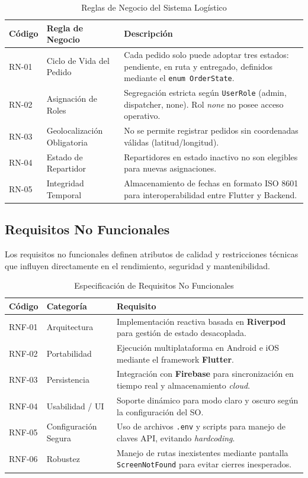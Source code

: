 \begin{table}[H]
\centering
\caption{Reglas de Negocio del Sistema Logístico}
\vspace{3mm}
\begin{tabularx}{\textwidth}{l p{4cm} L}
\toprule
\textbf{Código} & \textbf{Regla de Negocio} & \textbf{Descripción} \\
\midrule
RN-01 & Ciclo de Vida del Pedido & Cada pedido solo puede adoptar tres estados: pendiente, en ruta y entregado, definidos mediante el \texttt{enum OrderState}. \\
RN-02 & Asignación de Roles & Segregación estricta según \texttt{UserRole} (admin, dispatcher, none). Rol \textit{none} no posee acceso operativo. \\
RN-03 & Geolocalización Obligatoria & No se permite registrar pedidos sin coordenadas válidas (latitud/longitud). \\
RN-04 & Estado de Repartidor & Repartidores en estado inactivo no son elegibles para nuevas asignaciones. \\
RN-05 & Integridad Temporal & Almacenamiento de fechas en formato ISO 8601 para interoperabilidad entre Flutter y Backend. \\
\bottomrule
\end{tabularx}
\end{table}

\subsection{Requisitos No Funcionales}
Los requisitos no funcionales definen atributos de calidad y restricciones técnicas que influyen directamente en el rendimiento, seguridad y mantenibilidad.

\begin{table}[H]
\centering
\caption{Especificación de Requisitos No Funcionales}
\vspace{3mm}
\begin{tabularx}{\textwidth}{l l L}
\toprule
\textbf{Código} & \textbf{Categoría} & \textbf{Requisito} \\
\midrule
RNF-01 & Arquitectura & Implementación reactiva basada en \textbf{Riverpod} para gestión de estado desacoplada. \\
RNF-02 & Portabilidad & Ejecución multiplataforma en Android e iOS mediante el framework \textbf{Flutter}. \\
RNF-03 & Persistencia & Integración con \textbf{Firebase} para sincronización en tiempo real y almacenamiento \textit{cloud}. \\
RNF-04 & Usabilidad / UI & Soporte dinámico para modo claro y oscuro según la configuración del SO. \\
RNF-05 & Configuración Segura & Uso de archivos \texttt{.env} y scripts para manejo de claves API, evitando \textit{hardcoding}. \\
RNF-06 & Robustez & Manejo de rutas inexistentes mediante pantalla \texttt{ScreenNotFound} para evitar cierres inesperados. \\
\bottomrule
\end{tabularx}
\end{table}
